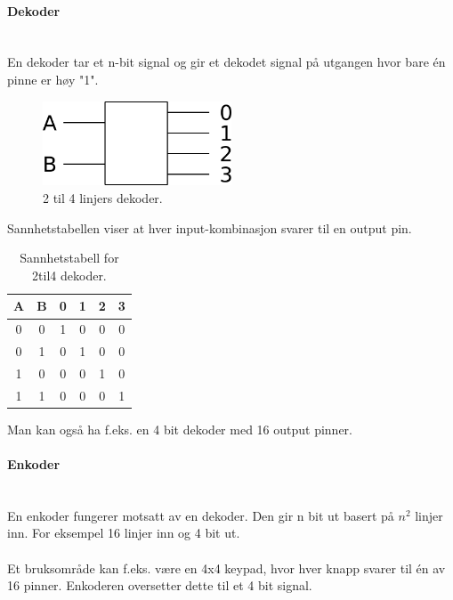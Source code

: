 \paragraph{Dekoder} \mbox{} \\
En dekoder tar et n-bit signal og gir et dekodet signal på utgangen hvor bare
én pinne er høy "1".

\begin{figure}[H]
  \caption{2 til 4 linjers dekoder.}
  \centering
  \includegraphics[width=0.5\textwidth]{./img/2to4}
\end{figure}

Sannhetstabellen viser at hver input-kombinasjon svarer til en output pin.

\begin{table}[H]
  \caption{Sannhetstabell for 2til4 dekoder.}
  \centering
  \begin{tabular}{c c | c c c c}
    A & B & 0 & 1 & 2 & 3 \\ \hline
    0 & 0 & 1 & 0 & 0 & 0 \\
    0 & 1 & 0 & 1 & 0 & 0 \\
    1 & 0 & 0 & 0 & 1 & 0 \\
    1 & 1 & 0 & 0 & 0 & 1
  \end{tabular}
\end{table}

Man kan også ha f.eks. en 4 bit dekoder med 16 output pinner.



\paragraph{Enkoder} \mbox{} \\
En enkoder fungerer motsatt av en dekoder.
Den gir n bit ut basert på $n^2$ linjer inn.
For eksempel 16 linjer inn og 4 bit ut.
\\\\
Et bruksområde kan f.eks. være en 4x4 keypad, hvor hver knapp svarer til én
av 16 pinner.
Enkoderen oversetter dette til et 4 bit signal.

